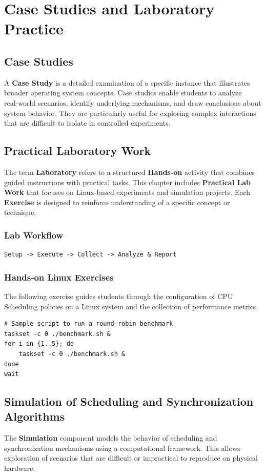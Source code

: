 \documentclass[12pt]{report}
\begin{document}
\pagestyle{plain}
\setcounter{page}{7}
\setcounter{chapter}{5}
\chapter{Case Studies and Laboratory Practice}

\section{Case Studies}
A \textbf{Case Study} is a detailed examination of a specific instance that illustrates broader operating system concepts. Case studies enable students to analyze real‑world scenarios, identify underlying mechanisms, and draw conclusions about system behavior. They are particularly useful for exploring complex interactions that are difficult to isolate in controlled experiments.

\section{Practical Laboratory Work}
The term \textbf{Laboratory} refers to a structured \textbf{Hands‑on} activity that combines guided instructions with practical tasks. This chapter includes \textbf{Practical Lab Work} that focuses on Linux‑based experiments and simulation projects. Each \textbf{Exercise} is designed to reinforce understanding of a specific concept or technique.

\subsection{Lab Workflow}
\begin{verbatim}
Setup -> Execute -> Collect -> Analyze & Report
\end{verbatim}

\subsection{Hands‑on Linux Exercises}
The following exercise guides students through the configuration of CPU Scheduling policies on a Linux system and the collection of performance metrics.

\begin{verbatim}
# Sample script to run a round‑robin benchmark
taskset -c 0 ./benchmark.sh &
for i in {1..5}; do
    taskset -c 0 ./benchmark.sh &
done
wait
\end{verbatim}

\section{Simulation of Scheduling and Synchronization Algorithms}
The \textbf{Simulation} component models the behavior of scheduling and synchronization mechanisms using a computational framework. This allows exploration of scenarios that are difficult or impractical to reproduce on physical hardware.
\end{document}

